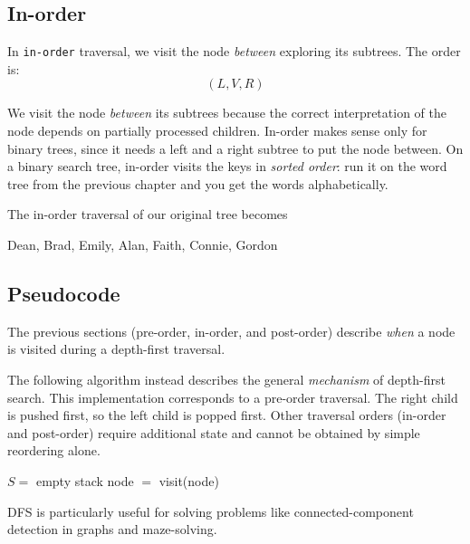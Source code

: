 \subsection{In-order}
In \texttt{in-order} traversal, we visit the node \emph{between} exploring its subtrees.
The order is:
\[
    (L, V, R)
\]

We visit the node \emph{between} its subtrees because the correct interpretation of the node depends on partially processed children.
In-order makes sense only for binary trees, since it needs a left and a right subtree to put the node between. On a binary search tree, in-order visits the keys in \emph{sorted order}: run it on the word tree from the previous chapter and you get the words alphabetically.

The in-order traversal of our original tree becomes
\begin{center}
    Dean, Brad, Emily, Alan, Faith, Connie, Gordon
\end{center}
\subsection{Pseudocode}

The previous sections (pre-order, in-order, and post-order) describe \emph{when} a node is visited during a depth-first traversal.

The following algorithm instead describes the general \emph{mechanism} of depth-first search. This implementation corresponds to a pre-order traversal. The right child is pushed first, so the left child is popped first. Other traversal orders (in-order and post-order) require additional state and cannot be obtained by simple reordering alone.
\begin{algorithm}
    \caption{Depth-First Search (DFS) - Iterative on a Tree}
    \begin{algorithmic}
        \State $S =$ empty stack
        \State {}
        \State node $=$ 
        \State visit(node)
        \State {}
        \EndIf
        \State {}
        \EndIf
        \EndWhile
        \EndProcedure
    \end{algorithmic}
\end{algorithm}

DFS is particularly useful for solving problems like connected-component detection in graphs and maze-solving.

